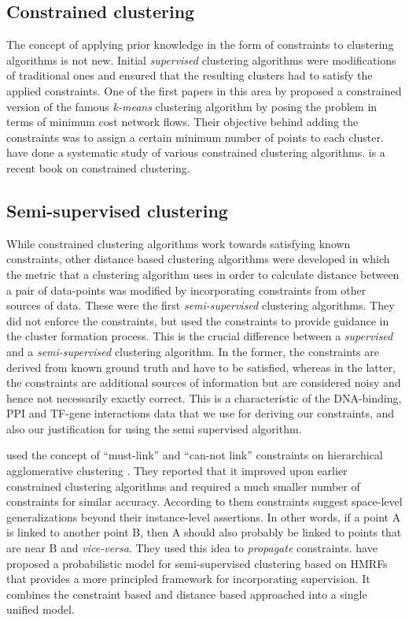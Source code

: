\subsection{Constrained clustering}
The concept of applying prior knowledge in the form of constraints to clustering algorithms is not new. Initial \textit{supervised} clustering algorithms were modifications of traditional ones and ensured that the resulting clusters had to satisfy the applied constraints. One of the first papers in this area by \citet{bradley00constrained} proposed a constrained version of the famous \textit{k-means} \citep{MacQueen67kmeans} clustering algorithm by posing the problem in terms of minimum cost network flows. Their objective behind adding the constraints was to assign a certain minimum number of points to each cluster. \citet{tung2001constraint} have done a systematic study of various constrained clustering algorithms. \citet{basu2008constrained} is a recent book on constrained clustering.

\subsection{Semi-supervised clustering}
While constrained clustering algorithms work towards satisfying known constraints, other distance based clustering algorithms were developed in which the metric that a clustering algorithm uses in order to calculate distance between a pair of data-points was modified by incorporating constraints from other sources of data. These were the first \textit{semi-supervised} clustering algorithms. They did not enforce the constraints, but used the constraints to provide guidance in the cluster formation process. This is the crucial difference between a \textit{supervised} and a \textit{semi-supervised} clustering algorithm. In the former, the constraints are derived from known ground truth and have to be satisfied, whereas in the latter, the constraints are additional sources of information but are considered noisy and hence not necessarily exactly correct. This is a characteristic of the DNA-binding, PPI and TF-gene interactions data that we use for deriving our constraints, and also our justification for using the semi supervised algorithm. 

\citet{klein2002frominstance} used the concept of ``must-link'' and ``can-not link'' constraints on hierarchical agglomerative clustering \citep{jain1988algorithms}. 
They reported that it improved upon earlier constrained clustering algorithms and required a much smaller number of constraints for similar accuracy. 
According to them constraints suggest space-level generalizations beyond their instance-level assertions. In other words, if a point A is linked to another point B, 
then A should also probably be linked to points that are near B and \textit{vice-versa}. They used this idea to \textit{propagate} constraints. \citet{basu2004probabilistic} have 
proposed a probabilistic model for semi-supervised clustering based on \acp{HMRF} that provides a more principled framework for incorporating supervision. It combines the constraint based and distance based approached into a single unified model.
 
